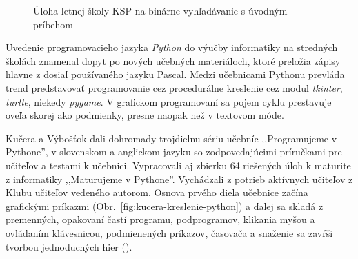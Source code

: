 \begin{figure}[h]
\centering
{}
\caption{Úloha letnej školy KSP na binárne vyhľadávanie s úvodným príbehom}
\label{fig:ksp-oblecenie}
\end{figure}

Uvedenie programovacieho jazyka \emph{Python} do výučby informatiky na stredných školách znamenal dopyt po nových učebných materiáloch, ktoré preložia zápisy hlavne z dosiaľ používaného jazyku Pascal. Medzi učebnicami Pythonu prevláda trend predstavovať programovanie cez procedurálne kreslenie cez modul \emph{tkinter}, \emph{turtle}, niekedy \emph{pygame}. V grafickom programovaní sa pojem cyklu prestavuje oveľa skorej ako podmienky, presne naopak než v textovom móde.

Kučera a Výbošťok dali dohromady trojdielnu sériu učebníc ,,Programujeme v Pythone'', v slovenskom a anglickom jazyku so zodpovedajúcimi príručkami pre učiteľov a testami k učebnici. Vypracovali aj zbierku 64 riešených úloh k maturite z informatiky ,,Maturujeme v Pythone''. Vychádzali z potrieb aktívnych učiteľov z Klubu učiteľov vedeného autorom. Osnova prvého diela učebnice začína grafickými príkazmi (Obr.~\ref{fig:kucera-kreslenie-python}) a ďalej sa skladá z premenných, opakovaní častí programu, podprogramov, klikania myšou a ovládaním klávesnicou, podmienených príkazov, časovača a snaženie sa zavŕši tvorbou jednoduchých hier (\cite{kucera_programujeme_2016}). 

